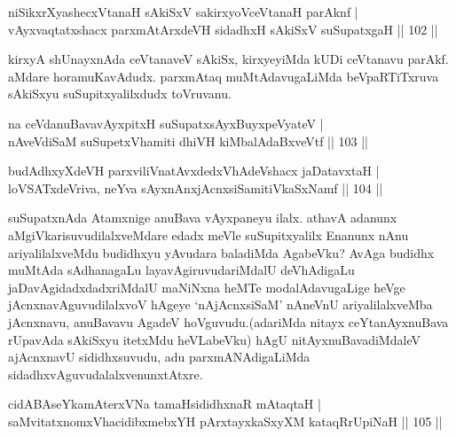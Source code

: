 
\begin{shl}
niSikxrXyashecxVtanaH sAkiSxV sakirxyoV\s ceVtanaH parAknf |\\
vAyxvaqtatxshacx parxmAtArxdeVH sidadhxH sAkiSxV suSupatxgaH \hfill || 102 ||
\end{shl}

\begin{artha}
kirxyA shUnayxnAda ceVtanaveV sAkiSx, kirxyeyiMda kUDi ceVtanavu parAkf. aMdare horamuKavAdudx. parxmAtaq muMtAdavugaLiMda beVpaRTiTxruva sAkiSxyu suSupitxyalilxdudx toVruvanu.
\end{artha}


\begin{shl}
na ceVdanuBavavAyxpitxH suSupatxsAyxBuyxpeVyateV |\\
nAveVdiSaM suSupetxV\s hamiti dhiVH kiMbalAdaBxveVtf \hfill || 103 ||
\end{shl}

\begin{shl}
budAdhxyXdeVH parxviliVnatAvxdedxVhAdeVshacx jaDatavxtaH |\\
loVSATxdeVriva, neYva sAyxnAnxjAcnxsiSamitiVkaSxNamf \hfill || 104 ||
\end{shl}

\begin{artha}
suSupatxnAda Atamxnige anuBava vAyxpaneyu ilalx. athavA adanunx aMgiVkarisuvudilalxveMdare edadx meVle suSupitxyalilx Enanunx nAnu ariyalilalxveMdu budidhxyu yAvudara baladiMda AgabeVku? AvAga budidhx muMtAda sAdhanagaLu layavAgiruvudariMdalU deVhAdigaLu jaDavAgidadxdadxriMdalU maNiNxna heMTe modalAdavugaLige heVge jAcnxnavAguvudilalxvoV hAgeye `nAjAcnxsiSaM' nAneVnU ariyalilalxveMba jAcnxnavu, anuBavavu AgadeV hoVguvudu.\break (adariMda nitayx ceYtanAyxnuBava rUpavAda sAkiSxyu itetxMdu heVLabeVku) hAgU nitAyxnuBavadiMdaleV ajAcnxnavU sididhxsuvudu, adu parxmANAdigaLiMda sidadhxvAguvudalalxvenunxtAtxre.
\end{artha}

\begin{shl}
cidABAseYkamAterxVNa tamaHsididhxnaR mAtaqtaH |\\
saMvitatxnomxVhacidibxmebxYH pArxtayxkaSxyXM kataqRrUpiNaH \hfill || 105 ||
\end{shl}

